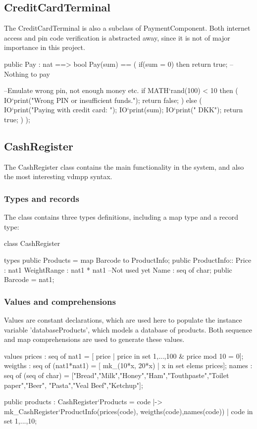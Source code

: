 \subsection{CreditCardTerminal}
The CreditCardTerminal is also a subclass of PaymentComponent. Both internet access and pin code verification is abstracted away, since it is not of major importance in this project.

\begin{vdmpp}
 public Pay : nat ==> bool
 Pay(sum) ==
 (
  if(sum = 0) then
   return true; -- Nothing to pay
   
 --Emulate wrong pin, not enough money etc.
  if MATH`rand(100) < 10 then 
  (
   IO`print("Wrong PIN or insufficient funds.\n");
   return false;
  ) else 
  (  
   IO`print("Paying with credit card: ");
   IO`print(sum);
   IO`print(" DKK\n");
   return true;
  )
 );	
\end{vdmpp}

\newpage
\subsection{CashRegister}
The CashRegister class contains the main functionality in the system, and also the most interesting vdmpp syntax.

\subsubsection{Types and records}
The class contains three types definitions, including a map type and a record type:
\begin{vdmpp}
class CashRegister

types
 public Products = map Barcode to ProductInfo;
 public ProductInfo::  Price : nat1
            WeightRange : nat1 * nat1 --Not used yet
            Name : seq of char;
 public Barcode = nat1;
\end{vdmpp}

\subsubsection{Values and comprehensions}
Values are constant declarations, which are used here to populate the instance variable 'databaseProducts', which models a database of products. Both sequence and map comprehensions are used to generate these values.
\begin{vdmpp}
values
 prices : seq of nat1 = [ price | price in set {1,...,100} & price mod 10 = 0];
 weigths : seq of (nat1*nat1) = [ mk_(10*x, 20*x) | x in set elems prices];
 names : seq of (seq of char) = ["Bread","Milk","Honey","Ham","Touthpaste","Toilet paper","Beer",
 																"Pasta","Veal Beef","Ketchup"];
 
 public products : CashRegister`Products = {code |-> mk_CashRegister`ProductInfo(prices(code),
 																					weigths(code),names(code)) | code in set {1,...,10}}; 
\end{vdmpp}

